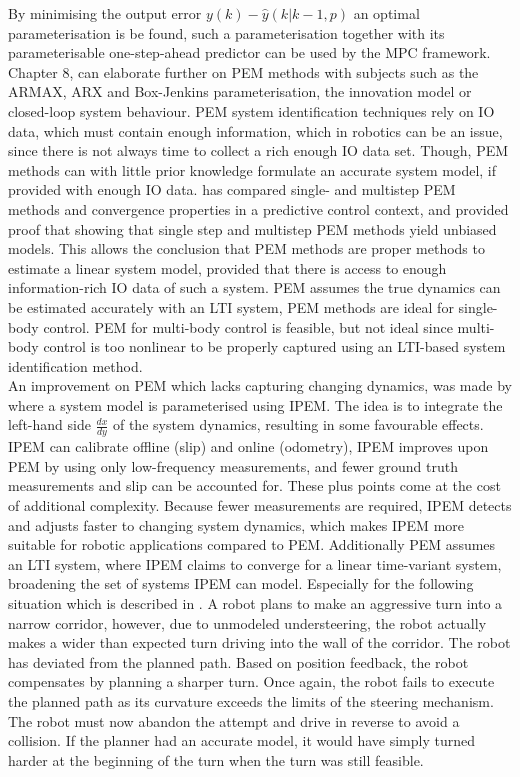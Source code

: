 By minimising the output error $y(k) - \hat{y}(k|k-1,p)$ an optimal parameterisation is be found, such a parameterisation together with its parameterisable one-step-ahead predictor can be used by the \ac{MPC} framework. Chapter 8, \cite{verhaegen_filtering_2007} can elaborate further on \ac{PEM} methods with subjects such as the ARMAX, ARX and Box-Jenkins parameterisation, the innovation model or closed-loop system behaviour. \ac{PEM} system identification techniques rely on \ac{IO} data, which must contain enough information, which in robotics can be an issue, since there is not always time to collect a rich enough \ac{IO} data set. Though, \ac{PEM} methods can with little prior knowledge formulate an accurate system model, if provided with enough \ac{IO} data. \cite{farina_convergence_2008} has compared single- and multistep \ac{PEM} methods and convergence properties in a predictive control context, and provided proof that showing that single step and multistep \ac{PEM} methods yield unbiased models. This allows the conclusion that \ac{PEM} methods are proper methods to estimate a linear system model, provided that there is access to enough information-rich \ac{IO} data of such a system. \ac{PEM} assumes the true dynamics can be estimated accurately with an \ac{LTI} system, \ac{PEM} methods are ideal for single-body control. \ac{PEM} for multi-body control is feasible, but not ideal since multi-body control is too nonlinear to be properly captured using an \ac{LTI}-based system identification method.\\

An improvement on \ac{PEM} which lacks capturing changing dynamics, was made by \cite{seegmiller_vehicle_2013} where a system model is parameterised using \ac{IPEM}. The idea is to integrate the left-hand side $\frac{dx}{dy}$ of the system dynamics, resulting in some favourable effects. \ac{IPEM} can calibrate offline (slip) and online (odometry), \ac{IPEM} improves upon \ac{PEM} by using only low-frequency measurements, and fewer ground truth measurements and slip can be accounted for. These plus points come at the cost of additional complexity.
Because fewer measurements are required, \ac{IPEM} detects and adjusts faster to changing system dynamics, which makes \ac{IPEM} more suitable for robotic applications compared to \ac{PEM}. Additionally \ac{PEM} assumes an \ac{LTI} system, where \ac{IPEM} claims to converge for a linear time-variant system, broadening the set of systems \ac{IPEM} can model. Especially for the following situation which is described in \cite{seegmiller_vehicle_2013}. A robot plans to make an aggressive turn into a narrow corridor, however, due to unmodeled understeering, the
robot actually makes a wider than expected turn driving into the wall of the corridor. The robot has deviated from the planned path. Based on position feedback, the robot
compensates by planning a sharper turn. Once again, the robot fails to execute the planned path as its curvature exceeds the limits
of the steering mechanism. The robot must now abandon the attempt and drive in reverse to avoid a collision. If the planner had an
accurate model, it would have simply turned harder at the beginning of the turn when the turn was still feasible.\\

